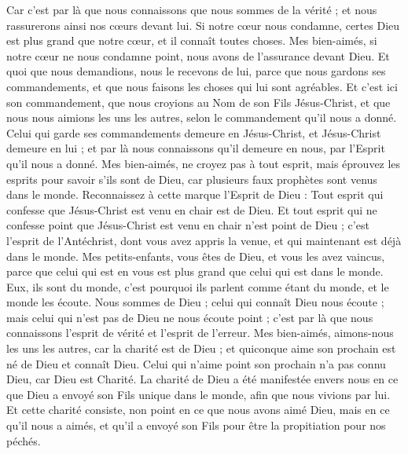\begin{multicols}{2}
Car c'est par là que nous connaissons que nous sommes de la vérité ; et nous rassurerons ainsi nos cœurs devant lui.
Si notre cœur nous condamne, certes Dieu est plus grand que notre cœur, et il connaît toutes choses.
Mes bien-aimés, si notre cœur ne nous condamne point, nous avons de l'assurance devant Dieu.
Et quoi que nous demandions, nous le recevons de lui, parce que nous gardons ses commandements, et que nous faisons les choses qui lui sont agréables.
Et c'est ici son commandement, que nous croyions au Nom de son Fils Jésus-Christ, et que nous nous aimions les uns les autres, selon le commandement qu'il nous a donné.
Celui qui garde ses commandements demeure en Jésus-Christ, et Jésus-Christ demeure en lui ; et par là nous connaissons qu'il demeure en nous, par l'Esprit qu'il nous a donné.
\VerseOne{}Mes bien-aimés, ne croyez pas à tout esprit, mais éprouvez les esprits pour savoir s'ils sont de Dieu, car plusieurs faux prophètes sont venus dans le monde.
Reconnaissez à cette marque l'Esprit de Dieu : Tout esprit qui confesse que Jésus-Christ est venu en chair est de Dieu.
Et tout esprit qui ne confesse point que Jésus-Christ est venu en chair n'est point de Dieu ; c'est l'esprit de l'Antéchrist, dont vous avez appris la venue, et qui maintenant est déjà dans le monde.
Mes petits-enfants, vous êtes de Dieu, et vous les avez vaincus, parce que celui qui est en vous est plus grand que celui qui est dans le monde.
Eux, ils sont du monde, c'est pourquoi ils parlent comme étant du monde, et le monde les écoute.
Nous sommes de Dieu ; celui qui connaît Dieu nous écoute ; mais celui qui n'est pas de Dieu ne nous écoute point ; c'est par là que nous connaissons l'esprit de vérité et l'esprit de l'erreur.
Mes bien-aimés, aimons-nous les uns les autres, car la charité est de Dieu ; et quiconque aime son prochain est né de Dieu et connaît Dieu.
Celui qui n'aime point son prochain n'a pas connu Dieu, car Dieu est Charité.
La charité de Dieu a été manifestée envers nous en ce que Dieu a envoyé son Fils unique dans le monde, afin que nous vivions par lui.
Et cette charité consiste, non point en ce que nous avons aimé Dieu, mais en ce qu'il nous a aimés, et qu'il a envoyé son Fils pour être la propitiation pour nos péchés.

\end{multicols}
